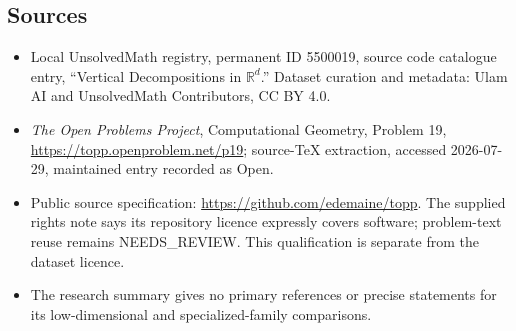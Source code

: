 \documentclass[11pt]{article}
\newcommand{\R}{\mathbb{R}}
\begin{document}
\subsection{Sources}
\begin{itemize}
\item Local UnsolvedMath registry, permanent ID 5500019, source code catalogue entry, ``Vertical Decompositions in $\R^d$.'' Dataset curation and metadata: Ulam AI and UnsolvedMath Contributors, CC BY 4.0.
\item \emph{The Open Problems Project}, Computational Geometry, Problem 19, \url{https://topp.openproblem.net/p19}; source-TeX extraction, accessed 2026-07-29, maintained entry recorded as Open.
\item Public source specification: \url{https://github.com/edemaine/topp}. The supplied rights note says its repository licence expressly covers software; problem-text reuse remains NEEDS\_REVIEW. This qualification is separate from the dataset licence.
\item The research summary gives no primary references or precise statements for its low-dimensional and specialized-family comparisons.
\end{itemize}
\end{document}

